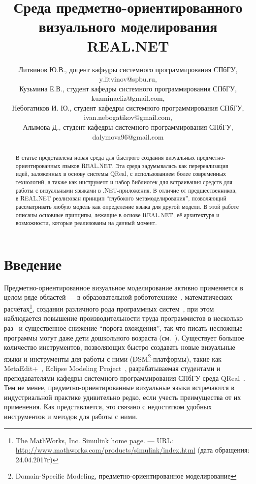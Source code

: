 \documentclass{spisok-article}
\title{Среда предметно-ориентированного визуального моделирования REAL.NET}
\author{
	Литвинов Ю.В., доцент кафедры системного программирования СПбГУ,
	y.litvinov@spbu.ru,

	Кузьмина Е.В., студент кафедры системного программирования СПбГУ,
	kuzminaeliz@gmail.com,

	Небогатиков И. Ю., студент кафедры системного программирования СПбГУ,
	ivan.nebogatikov@gmail.com,

	Алымова Д., студент кафедры системного программирования СПбГУ, 
	dalymova96@gmail.com
}
\begin{document}
\maketitle

\begin{abstract}
В статье представлена новая среда для быстрого создания визуальных предметно-ориентированных языков REAL.NET. Эта среда задумывалась как перереализация идей, заложенных в основу системы QReal, с использованием более современных технологий, а также как инструмент и набор библиотек для встраивания средств для работы с визуальными языками в .NET-приложения. В отличие от предшественников, в REAL.NET реализован принцип ``глубокого метамоделирования'', позволяющий рассматривать любую модель как определение языка для другой модели. В этой работе описаны основные принципы, лежащие в основе REAL.NET, её архитектура и возможности, которые реализованы на данный момент.
\end{abstract}

\section{Введение}

Предметно-ориентированное визуальное моделирование активно применяется в целом ряде областей --- в образовательной робототехнике~\cite{portsmore1999robolab}, математических расчётах\footnote{The MathWorks, Inc. Simulink home page. –– URL: \url{http://www.mathworks.com/products/simulink/index.html} (дата обращения: 24.04.2017г)}, создании различного рода программных систем~\cite{luoma2004defining}, при этом наблюдается повышение производительности труда программистов в несколько раз~\cite{kelly2000visual} и существенное снижение ``порога вхождения'', так что писать несложные программы могут даже дети дошкольного возраста (см.~\cite{portsmore1999robolab}). Существует большое количество инструментов, позволяющих быстро создавать новые визуальные языки и инструменты для работы с ними (DSM\footnote{Domain-Specific Modeling, предметно-ориентированное моделирование}-платформы), такие как MetaEdit+~\cite{kelly2008domain}, Eclipse Modeling Project~\cite{gronback2009eclipse}, разрабатываемая студентами и преподавателями кафедры системного программирования СПбГУ среда QReal~\cite{terekhov2013qreal,kuzenkova2013qreal,kuzenkova2011qreal}. Тем не менее, предметно-ориентированные визуальные языки встречаются в индустриальной практике удивительно редко, если учесть преимущества от их применения. Как представляется, это связано с недостатком удобных инструментов и методов для работы с ними.
\end{document}
